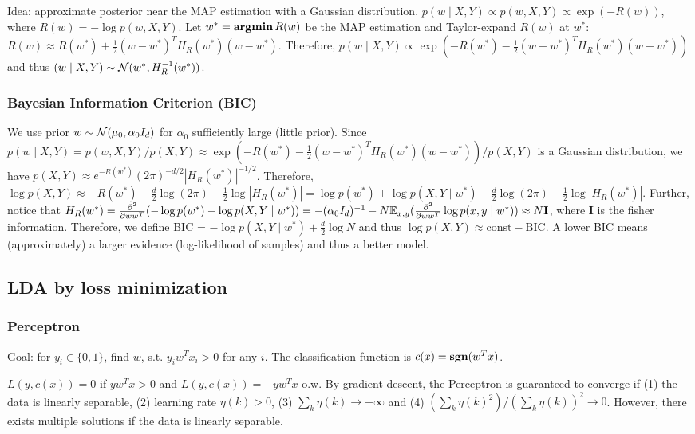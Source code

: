 Idea: approximate posterior near the MAP estimation with a Gaussian distribution.
$p(w\mid X, Y) \propto p(w, X, Y) \propto \exp(-R(w))$, where $R(w) = -\log p(w, X, Y)$. Let $w^* = \operatorname{\textbf{argmin}} R(w)$ be the MAP estimation and Taylor-expand $R(w)$ at $w^*$: $R(w) \approx R(w^*) + \frac{1}{2}(w-w^*)^T H_R(w^*) (w-w^*)$. Therefore, $p(w\mid X,Y)\propto \exp(-R(w^*) -\frac{1}{2}(w-w^*)^T H_R(w^*) (w-w^*))$ and thus $(w\mid X,Y) \sim \mathcal{N}(w^*, H_R^{-1}(w^*))$.

\subsubsection*{Bayesian Information Criterion (BIC)}

We use prior $w\sim \mathcal{N}(\mu_0, \alpha_0 I_d)$ for $\alpha_0$ sufficiently large (little prior). Since $p(w\mid X, Y) = p(w, X, Y) / p(X, Y) \approx \exp(-R(w^*) -\frac{1}{2}(w-w^*)^T H_R(w^*) (w-w^*)) / p(X, Y)$ is a Gaussian distribution, we have $p(X, Y)\approx e^{-R(w^*)}(2\pi)^{-d/2}|H_R(w^*)|^{-1/2}$. Therefore, $\log p(X,Y)\approx -R(w^*) -\frac{d}{2}\log(2\pi) - \frac{1}{2}\log |H_R(w^*)| = \log p(w^*) + \log p(X, Y\mid w^*)-\frac{d}{2}\log(2\pi) - \frac{1}{2}\log |H_R(w^*)|$. Further, notice that $H_R(w^*) = \frac{\partial^2}{\partial ww^T}(-\log p(w^*)-\log p(X, Y \mid w^*)) = -(\alpha_0 I_d)^{-1} - N \mathbb{E}_{x, y} (\frac{\partial^2}{\partial ww^T} \log p(x,y\mid w^*)) \approx N \mathbf{I}$, where $\mathbf{I}$ is the fisher information.
Therefore, we define BIC = $-\log p(X, Y\mid w^*)+ \frac{d}{2}\log N$ and thus $\log p(X, Y) \approx \text{const} - \text{BIC}$. A lower BIC means (approximately) a larger evidence (log-likelihood of samples) and thus a better model.

\subsection*{LDA by loss minimization}

\subsubsection*{Perceptron}

Goal: for $y_i\in\{0,1\}$, find $w$, s.t. $y_i w^T x_i >0$ for any $i$. The classification function is $c(x) = \operatorname{\textbf{sgn}}(w^T x)$.

$L(y, c(x)) = 0$ if $y w^T x >0$ and $L(y, c(x)) = -y w^T x$ o.w. By gradient descent, the Perceptron is guaranteed to converge if (1) the data is linearly separable, (2) learning rate $\eta(k)>0$, (3) $\sum_k \eta(k) \rightarrow +\infty$ and (4) $(\sum_k \eta(k)^2)/(\sum_k \eta(k))^2 \rightarrow 0$. However, there exists multiple solutions if the data is linearly separable.

